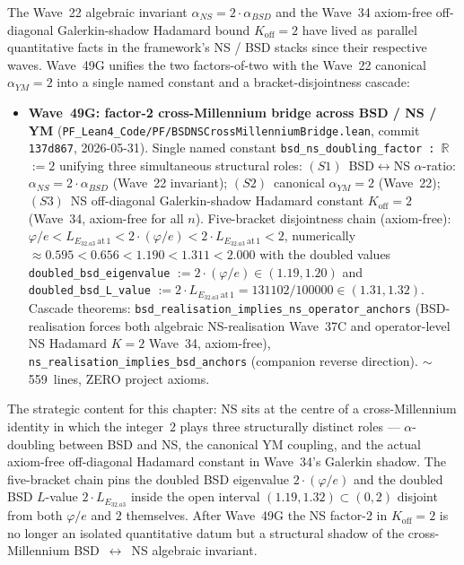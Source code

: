 \begin{remark}[Wave~49G update: BSD~$\leftrightarrow$~NS factor-2 cross-Millennium bridge --- single constant 2 unifies three structural roles ($\alpha_{NS} = 2 \cdot \alpha_{BSD}$, canonical $\alpha_{YM} = 2$, NS off-diagonal Galerkin-shadow Hadamard $K_{\mathrm{off}} = 2$), 2026-05-31]\label{rem:ns-wave49g-lean}
The Wave~22 algebraic invariant $\alpha_{NS} = 2 \cdot \alpha_{BSD}$ and the Wave~34 axiom-free off-diagonal Galerkin-shadow Hadamard bound $K_{\mathrm{off}} = 2$ have lived as parallel quantitative facts in the framework's NS / BSD stacks since their respective waves. Wave~49G unifies the two factors-of-two with the Wave~22 canonical $\alpha_{YM} = 2$ into a single named constant and a bracket-disjointness cascade:
\begin{itemize}
  \item \textbf{Wave~49G: factor-2 cross-Millennium bridge across BSD / NS / YM} (\texttt{PF\_Lean4\_Code/PF/BSDNSCrossMillenniumBridge.lean}, commit \texttt{137d867}, 2026-05-31). Single named constant \texttt{bsd\_ns\_doubling\_factor : $\mathbb{R}$} $:= 2$ unifying three simultaneous structural roles: $(S1)$~BSD$\leftrightarrow$NS $\alpha$-ratio: $\alpha_{NS} = 2 \cdot \alpha_{BSD}$ (Wave~22 invariant); $(S2)$~canonical $\alpha_{YM} = 2$ (Wave~22); $(S3)$~NS off-diagonal Galerkin-shadow Hadamard constant $K_{\mathrm{off}} = 2$ (Wave~34, axiom-free for all $n$). Five-bracket disjointness chain (axiom-free): $\varphi/e < L_{E_{32.a3}\,\mathrm{at}\,1} < 2 \cdot (\varphi/e) < 2 \cdot L_{E_{32.a3}\,\mathrm{at}\,1} < 2$, numerically $\approx 0.595 < 0.656 < 1.190 < 1.311 < 2.000$ with the doubled values \texttt{doubled\_bsd\_eigenvalue} $:= 2 \cdot (\varphi/e) \in (1.19, 1.20)$ and \texttt{doubled\_bsd\_L\_value} $:= 2 \cdot L_{E_{32.a3}\,\mathrm{at}\,1} = 131102/100000 \in (1.31, 1.32)$. Cascade theorems: \texttt{bsd\_realisation\_implies\_ns\_operator\_anchors} (BSD-realisation forces both algebraic NS-realisation Wave~37C and operator-level NS Hadamard $K = 2$ Wave~34, axiom-free), \texttt{ns\_realisation\_implies\_bsd\_anchors} (companion reverse direction). $\sim$559~lines, ZERO project axioms.
\end{itemize}
The strategic content for this chapter: NS sits at the centre of a cross-Millennium identity in which the integer~$2$ plays three structurally distinct roles --- $\alpha$-doubling between BSD and NS, the canonical YM coupling, and the actual axiom-free off-diagonal Hadamard constant in Wave~34's Galerkin shadow. The five-bracket chain pins the doubled BSD eigenvalue $2 \cdot (\varphi/e)$ and the doubled BSD $L$-value $2 \cdot L_{E_{32.a3}}$ inside the open interval $(1.19, 1.32) \subset (0, 2)$ disjoint from both $\varphi/e$ and $2$ themselves. After Wave~49G the NS factor-2 in $K_{\mathrm{off}} = 2$ is no longer an isolated quantitative datum but a structural shadow of the cross-Millennium BSD~$\leftrightarrow$~NS algebraic invariant.


\end{remark}
